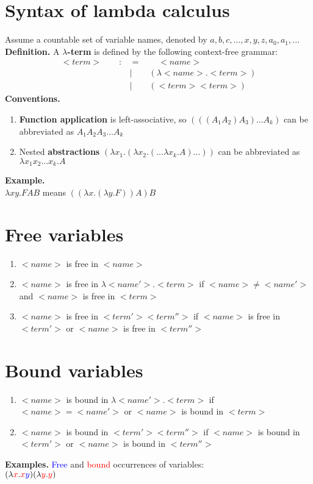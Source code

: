 \documentclass{article}
\begin{document}
\section{Syntax of lambda calculus}
Assume a countable set of variable names, denoted by $a, b, c, ..., x, y, z, a_0, a_1, ...$\medskip
\\\textbf{Definition.} A \textbf{$\lambda$-term} is defined by the following context-free grammar:
\begin{align*}
<term>\qquad:&=\qquad <name>\\
 & |\qquad(\lambda <name> . <term>)\\
& |\qquad(<term><term>)
\end{align*}
\textbf{Conventions.}
\begin{enumerate}
	\item \textbf{Function application} is left-associative, so $(((A_1A_2)A_3)...A_k)$ can be abbreviated as $A_1A_2A_3...A_k$
	\item Nested \textbf{abstractions} $(\lambda x_1.(\lambda x_2.(...\lambda x_k. A)...))$ can be abbreviated as $\lambda x_1x_2...x_k.A$
\end{enumerate}
\textbf{Example.}
\\ $\lambda x y.F A B$ means $((\lambda x.(\lambda y.F)) A) B$

\section{Free variables}
\begin{enumerate}
	\item $<name>$ is free in $<name>$
	\item $<name>$ is free in $\lambda<name'>.<term>$ if $<name>\neq<name'>$ and $<name>$ is free in $<term>$
	\item $<name>$ is free in $<term'><term''>$ if $<name>$ is free in $<term'>$ or $<name>$ is free in $<term''>$
\end{enumerate}

\section{Bound variables}
\begin{enumerate}
	\item $<name>$ is bound in $\lambda<name'>.<term>$ if $<name>=<name'>$ or $<name>$ is bound in $<term>$
	\item $<name>$ is bound in $<term'><term''>$ if $<name>$ is bound in $<term'>$ or $<name>$ is bound in $<term''>$
\end{enumerate}
\textbf{Examples.} \textcolor{blue}{Free} and \textcolor{red}{bound} occurrences of variables:
\\ $(\lambda \textcolor{red}{x}.\textcolor{red}{x}\textcolor{blue}{y})(\lambda\textcolor{red}{y}.\textcolor{red}{y})$
\end{document}
